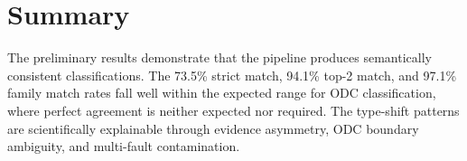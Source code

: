 \documentclass{iutbscthesis}
\begin{document}
\section{Summary}

The preliminary results demonstrate that the pipeline produces semantically consistent classifications. The 73.5\% strict match, 94.1\% top-2 match, and 97.1\% family match rates fall well within the expected range for ODC classification, where perfect agreement is neither expected nor required. The type-shift patterns are scientifically explainable through evidence asymmetry, ODC boundary ambiguity, and multi-fault contamination.




\end{document}
